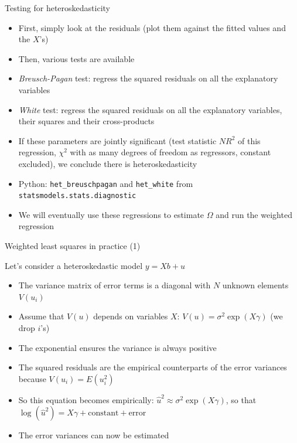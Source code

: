 \documentclass[aspectratio=169]{beamer}
\begin{document}
\begin{frame}{Testing for heteroskedasticity}

\begin{itemize}
    \item First, simply look at the residuals (plot them against the fitted values and the $X$'s)
    \item Then, various tests are available
    \item \textit{Breusch-Pagan} test: regress the squared residuals on all the explanatory variables
    \item \textit{White} test: regress the squared residuals on all the explanatory variables, their squares and their cross-products
    \item If these parameters are jointly significant (test statistic $N R^2$ of this regression, $\chi^2$ with as many degrees of freedom as regressors, constant excluded), we conclude there is heteroskedasticity
    \item Python: \texttt{het\_breuschpagan} and \texttt{het\_white} from \texttt{statsmodels.stats.diagnostic}
    \item We will eventually use these regressions to estimate $\Omega$ and run the weighted regression
\end{itemize}

\end{frame}

\begin{frame}{Weighted least squares in practice (1)}

Let's consider a heteroskedastic model $y = Xb + u$

\begin{itemize}
    \item The variance matrix of error terms is a diagonal with $N$ unknown elements $V(u_i)$
    \item Assume that $V(u)$ depends on variables $X$: $V(u) = \sigma^2 \exp(X\gamma)$ (we drop $i$'s)
    \item The exponential ensures the variance is always positive
    \item The squared residuals are the empirical counterparts of the error variances because $V(u_i) = E(u_i^2)$
    \item So this equation becomes empirically: $\hat{u}^2 \approx \sigma^2 \exp(X\gamma)$, so that $\log(\hat{u}^2) = X\gamma + \text{constant} + \text{error}$
    \item The error variances can now be estimated
\end{itemize}

\end{frame}
\end{document}
